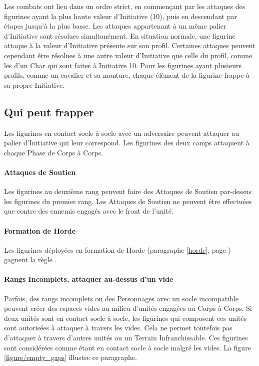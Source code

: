 \vspace*{0.5cm}
Les combats ont lieu dans un ordre strict, en commençant par les attaques des figurines ayant la plus haute valeur d'Initiative (10), puis en descendant par étapes jusqu'à la plus basse. Les attaques appartenant à un même palier d'Initiative sont résolues simultanément. En situation normale, une figurine attaque à la valeur d'Initiative présente sur son profil. Certaines attaques peuvent cependant être résolues à une autre valeur d'Initiative que celle du profil, comme les \impacthits{} d'un Char qui sont faites à Initiative 10. Pour les figurines ayant plusieurs profils, comme un cavalier et sa monture, chaque élément de la figurine frappe à sa propre Initiative.

\newpage
\subsection{Qui peut frapper}

Les figurines en contact socle à socle avec un adversaire peuvent attaquer au palier d'Initiative qui leur correspond. Les figurines des deux camps attaquent à chaque Phase de Corps à Corps.

\paragraph{Attaques de Soutien}

Les figurines au deuxième rang peuvent faire des Attaques de Soutien par-dessus les figurines du premier rang. Les Attaques de Soutien ne peuvent être effectuées que contre des ennemis engagés avec le front de l'unité.

\paragraph{Formation de Horde}

Les figurines déployées en formation de Horde (paragraphe \ref{horde}, page \pageref{horde}) gagnent la règle \fightinextrarank{}.

\paragraph{Rangs Incomplets, attaquer au-dessus d'un vide}

Parfois, des rangs incomplets ou des Personnages avec un socle incompatible peuvent créer des espaces vides au milieu d'unités engagées au Corps à Corps. Si deux unités sont en contact socle à socle, les figurines qui composent ces unités sont autorisées à attaquer à travers les vides. Cela ne permet toutefois pas d'attaquer à travers d'autres unités ou un Terrain Infranchissable. Ces figurines sont considérées comme étant en contact socle à socle malgré les vides. La figure \ref{figure/empty_gaps} illustre ce paragraphe.

